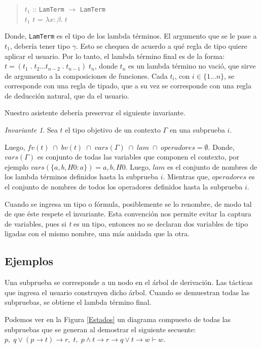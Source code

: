 \documentclass[a4paper,11pt]{article}
\theoremstyle{definition}
\theoremstyle{remark}
\newtheorem{invariant}{Invariante}
\begin{document}
\begin{verse}
  $t_{1}$ :: \texttt{LamTerm} $\rightarrow$  \texttt{LamTerm} \\
  $t_{1}$ $t$ = $\lambda x:\beta. \; t$
\end{verse}

Donde, \texttt{LamTerm} es el tipo de los lambda términos. El argumento que se le pase a $t_{1}$, debería tener tipo $\gamma$.
Esto se chequea de acuerdo a qué regla de tipo quiere aplicar el usuario.
Por lo tanto, el lambda término final es de la forma: $t = (t_{1} \; . \; t_{2} \dots t_{n-2} \; . \; t_{n-1}) \; t_{n}$, donde $t_{n}$ es un lambda término no vació, que sirve de argumento a la composiciones
de funciones. Cada $t_{i}$, con $i \in \{ 1 \dots n \}$, se corresponde con una regla de tipado, que a su vez se corresponde con una regla de deducción natural, 
que da el usuario.

Nuestro asistente debería preservar el siguiente invariante. 

\begin{invariant}
Sea $t$ el tipo objetivo de un contexto $\Gamma$ en una subprueba $i$. 

Luego, $fv(t) \; \cap \; bv(t) \; \cap \; vars(\Gamma) \; \cap \; lam \; \cap \; operadores = \emptyset$.
Donde, $vars(\Gamma)$ es conjunto de todas las variables que componen el contexto,
por ejemplo $vars(\{a,b,H0:a\})= {a,b,H0}$. Luego, $lam$ es el conjunto de nombres de los lambda términos definidos hasta
la subprueba $i$. Mientras que, $operadores$ es el conjunto de nombres de todos los operadores definidos hasta la subprueba $i$.  
\end{invariant}

Cuando se ingresa un tipo o fórmula, posiblemente se lo renombre, de modo tal de que éste respete el invariante.
Esta convención nos permite evitar la captura de variables, pues si \textit{t} es un tipo, entonces no se declaran 
dos variables de tipo ligadas con el mismo nombre, una más anidada que la otra.

\subsection{Ejemplos}
\label{ejemplos}

Una subprueba se corresponde a un nodo en el árbol de derivación. 
Las tácticas que ingresa el usuario construyen dicho árbol. Cuando se demuestran todas las subpruebas, se obtiene el lambda término final. 

Podemos ver en la Figura \ref{Estados} un diagrama compuesto de todas las subpruebas que se generan al demostrar el
siguiente secuente:
$p, \; q \vee  (p \rightarrow t) \rightarrow  r, \; t, \; p \wedge t \rightarrow r \rightarrow q \vee t \rightarrow w \vdash w$.
\end{document}
